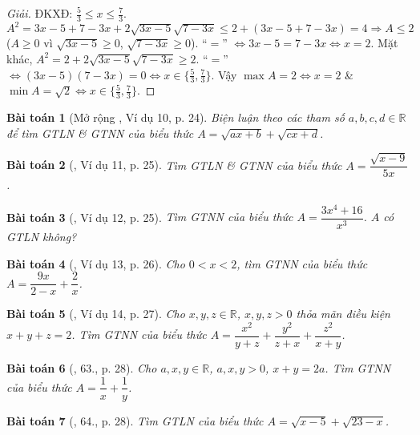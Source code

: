 \documentclass{article}
\newtheorem{baitoan}{Bài toán}
\begin{document}
\begin{proof}[Giải]
	ĐKXĐ: $\frac{5}{3}\le x\le\frac{7}{3}$. $A^2 = 3x - 5 + 7 - 3x + 2\sqrt{3x - 5}\sqrt{7 - 3x}\le2 + (3x - 5 + 7 - 3x) = 4\Rightarrow A\le2$ ($A\ge0$ vì $\sqrt{3x - 5}\ge0$, $\sqrt{7 - 3x}\ge0$). ``$=$'' $\Leftrightarrow 3x - 5 = 7 - 3x\Leftrightarrow x = 2$. Mặt khác, $A^2 = 2 + 2\sqrt{3x - 5}\sqrt{7 - 3x}\ge2$. ``$=$'' $\Leftrightarrow(3x - 5)(7 - 3x) = 0\Leftrightarrow x\in\{\frac{5}{3},\frac{7}{3}\}$. Vậy $\max A = 2\Leftrightarrow x = 2$ \& $\min A = \sqrt{2}\Leftrightarrow x\in\{\frac{5}{3},\frac{7}{3}\}$.
\end{proof}

\begin{baitoan}[Mở rộng \cite{Tuyen_Toan_9}, Ví dụ 10, p. 24]
	Biện luận theo các tham số $a,b,c,d\in\mathbb{R}$ để tìm {\rm GTLN} \& {\rm GTNN} của biểu thức $A = \sqrt{ax + b} + \sqrt{cx + d}$.
\end{baitoan}

\begin{baitoan}[\cite{Tuyen_Toan_9}, Ví dụ 11, p. 25]
	Tìm {\rm GTLN} \& {\rm GTNN} của biểu thức $A = \dfrac{\sqrt{x - 9}}{5x}$.
\end{baitoan}

\begin{baitoan}[\cite{Tuyen_Toan_9}, Ví dụ 12, p. 25]
	Tìm {\rm GTNN} của biểu thức $A = \dfrac{3x^4 + 16}{x^3}$. $A$ có {\rm GTLN} không?
\end{baitoan}

\begin{baitoan}[\cite{Tuyen_Toan_9}, Ví dụ 13, p. 26]
	Cho $0 < x < 2$, tìm {\rm GTNN} của biểu thức $A = \dfrac{9x}{2 - x} + \dfrac{2}{x}$. 
\end{baitoan}

\begin{baitoan}[\cite{Tuyen_Toan_9}, Ví dụ 14, p. 27]
	Cho $x,y,z\in\mathbb{R}$, $x,y,z > 0$ thỏa mãn điều kiện $x + y + z = 2$. Tìm {\rm GTNN} của biểu thức $A = \dfrac{x^2}{y + z} + \dfrac{y^2}{z + x} + \dfrac{z^2}{x + y}$.
\end{baitoan}

\begin{baitoan}[\cite{Tuyen_Toan_9}, 63., p. 28]
	Cho $a,x,y\in\mathbb{R}$, $a,x,y > 0$, $x + y = 2a$. Tìm {\rm GTNN} của biểu thức $A = \dfrac{1}{x} + \dfrac{1}{y}$.
\end{baitoan}

\begin{baitoan}[\cite{Tuyen_Toan_9}, 64., p. 28]
	Tìm {\rm GTLN} của biểu thức $A = \sqrt{x - 5} + \sqrt{23 - x}$.
\end{baitoan}
\end{document}
